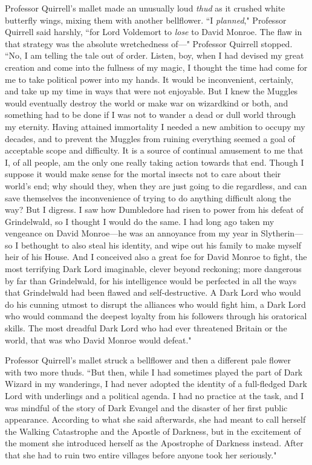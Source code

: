 Professor Quirrell's mallet made an unusually loud \emph{thud} as it crushed white butterfly wings, mixing them with another bellflower. ``I \emph{planned}," Professor Quirrell said harshly, ``for Lord Voldemort to \emph{lose} to David Monroe. The flaw in that strategy was the absolute wretchedness of—" Professor Quirrell stopped. ``No, I am telling the tale out of order. Listen, boy, when I had devised my great creation and come into the fullness of my magic, I thought the time had come for me to take political power into my hands. It would be inconvenient, certainly, and take up my time in ways that were not enjoyable. But I knew the Muggles would eventually destroy the world or make war on wizardkind or both, and something had to be done if I was not to wander a dead or dull world through my eternity. Having attained immortality I needed a new ambition to occupy my decades, and to prevent the Muggles from ruining everything seemed a goal of acceptable scope and difficulty. It is a source of continual amusement to me that I, of all people, am the only one really taking action towards that end. Though I suppose it would make sense for the mortal insects not to care about their world's end; why should they, when they are just going to die regardless, and can save themselves the inconvenience of trying to do anything difficult along the way? But I digress. I saw how Dumbledore had risen to power from his defeat of Grindelwald, so I thought I would do the same. I had long ago taken my vengeance on David Monroe—he was an annoyance from my year in Slytherin—so I bethought to also steal his identity, and wipe out his family to make myself heir of his House. And I conceived also a great foe for David Monroe to fight, the most terrifying Dark Lord imaginable, clever beyond reckoning; more dangerous by far than Grindelwald, for his intelligence would be perfected in all the ways that Grindelwald had been flawed and self-destructive. A Dark Lord who would do his cunning utmost to disrupt the alliances who would fight him, a Dark Lord who would command the deepest loyalty from his followers through his oratorical skills. The most dreadful Dark Lord who had ever threatened Britain or the world, that was who David Monroe would defeat."

Professor Quirrell's mallet struck a bellflower and then a different pale flower with two more thuds. ``But then, while I had sometimes played the part of Dark Wizard in my wanderings, I had never adopted the identity of a full-fledged Dark Lord with underlings and a political agenda. I had no practice at the task, and I was mindful of the story of Dark Evangel and the disaster of her first public appearance. According to what she said afterwards, she had meant to call herself the Walking Catastrophe and the Apostle of Darkness, but in the excitement of the moment she introduced herself as the Apostrophe of Darkness instead. After that she had to ruin two entire villages before anyone took her seriously."

